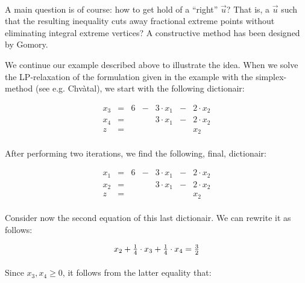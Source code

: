 {\paragraph{}
A main question is of course: how to get hold of a ``right'' $\vec{u}$? That is, a $\vec{u}$ such that the resulting inequality cuts away fractional extreme points without eliminating integral extreme vertices? A constructive method has been designed by Gomory.

\begin{example}
We continue our example described above to illustrate the idea. When we solve the LP-relaxation of the formulation given in the example with the simplex-method (see e.g. Chv\`atal\cite{Chvatal/83/Linear}), we start with the following dictionair:

\begin{equation}
\begin{array}{rcrcrcr}
x_3&=&6&-&3\cdot x_1&-&2\cdot x_2\\
x_4&=&&&3\cdot x_1&-&2\cdot x_2\\\hline
z&=&&&&&x_2
\end{array}
\end{equation}

\paragraph{}
After performing two iterations, we find the following, final, dictionair:

\begin{equation}
\begin{array}{rcrcrcr}
x_1&=&6&-&3\cdot x_1&-&2\cdot x_2\\
x_2&=&&&3\cdot x_1&-&2\cdot x_2\\\hline
z&=&&&&&x_2
\end{array}
\end{equation}

\paragraph{}
Consider now the second equation of this last dictionair. We can rewrite it as follows:

\begin{equation}
x_2+\tfrac{1}{4}\cdot x_3+\tfrac{1}{4}\cdot x_4=\tfrac{3}{2}\eqnlab{cg-cut-eq2-ini}
\end{equation}

\paragraph{}
Since $x_3,x_4\geq 0$, it follows from the latter equality that:


\end{example}}
